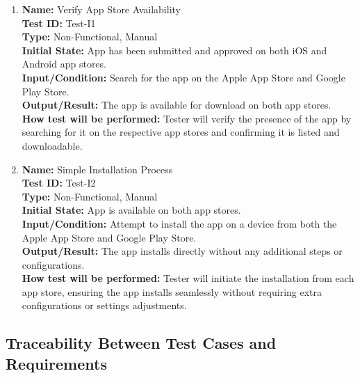\documentclass[12pt, titlepage]{article}
\begin{document}
\begin{enumerate}
    \item \textbf{Name:} Verify App Store Availability \label{itm:Test-I1} \\
    \textbf{Test ID:} Test-I1 \\
    \textbf{Type:} Non-Functional, Manual \\
    \textbf{Initial State:} App has been submitted and approved on both iOS and Android app stores. \\
    \textbf{Input/Condition:} Search for the app on the Apple App Store and Google Play Store. \\
    \textbf{Output/Result:} The app is available for download on both app stores. \\
    \textbf{How test will be performed:} Tester will verify the presence of the app by searching for it on the respective app stores and confirming it is listed and downloadable.

    \item \textbf{Name:} Simple Installation Process \label{itm:Test-I2} \\
    \textbf{Test ID:} Test-I2 \\
    \textbf{Type:} Non-Functional, Manual \\
    \textbf{Initial State:} App is available on both app stores. \\
    \textbf{Input/Condition:} Attempt to install the app on a device from both the Apple App Store and Google Play Store. \\
    \textbf{Output/Result:} The app installs directly without any additional steps or configurations. \\
    \textbf{How test will be performed:} Tester will initiate the installation from each app store, ensuring the app installs seamlessly without requiring extra configurations or settings adjustments.
\end{enumerate}


\subsection{Traceability Between Test Cases and Requirements}

\end{document}
